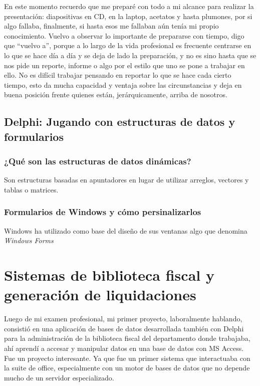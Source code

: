 \documentclass[12pt,spanish,lettersize]{book}
\begin{document}
En este momento recuerdo que me preparé con todo a mi alcance para realizar la presentación: diapositivas en CD, en la laptop, acetatos y hasta plumones, por si algo fallaba, finalmente, si hasta esos me fallaban aún tenía mi propio conocimiento. Vuelvo a observar lo importante de prepararse con tiempo, digo que “vuelvo a”, porque a lo largo de la vida profesional es frecuente centrarse en lo que se hace día a día y se deja de lado la preparación, y no es sino hasta que se nos pide un reporte, informe o algo por el estilo que uno se pone a trabajar en ello. No es difícil trabajar pensando en reportar lo que se hace cada cierto tiempo, esto da mucha capacidad y ventaja sobre las circunstancias y deja en buena posición frente quienes están, jerárquicamente, arriba de nosotros.

\subsection{Delphi: Jugando con estructuras de datos y formularios}

\subsubsection{¿Qué son las estructuras de datos dinámicas?}
Son estructuras basadas en apuntadores en lugar de utilizar arreglos, vectores y tablas o matrices.

\subsubsection{Formularios de Windows y cómo persinalizarlos}
Windows ha utilizado como base del diseño de sus ventanas algo que denomina \emph{Windows Forms}

\section{Sistemas de biblioteca fiscal y generación de liquidaciones}
Luego de mi examen profesional, mi primer proyecto, laboralmente hablando, consistió en una aplicación de bases de datos desarrollada también con Delphi para la administración de la biblioteca fiscal del departamento donde trabajaba, ahí aprendí a accesar y manipular datos en una base de datos con MS Access. Fue un proyecto interesante. Ya que fue un primer sistema que interactuaba con la suite de office, especialmente con un motor de bases de datos que no depende mucho de un servidor especializado.\\
\end{document}
